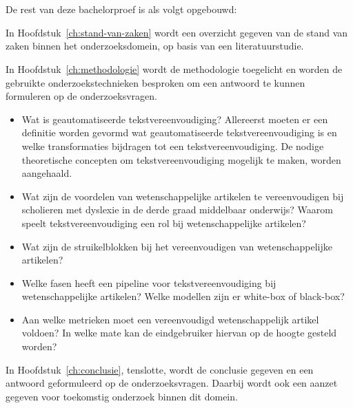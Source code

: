 \section{}%
\label{sec:opzet-bachelorproef}


De rest van deze bachelorproef is als volgt opgebouwd:

In Hoofdstuk~\ref{ch:stand-van-zaken} wordt een overzicht gegeven van de stand van zaken binnen het onderzoeksdomein, op basis van een literatuurstudie.

In Hoofdstuk~\ref{ch:methodologie} wordt de methodologie toegelicht en worden de gebruikte onderzoekstechnieken besproken om een antwoord te kunnen formuleren op de onderzoeksvragen.


\begin{itemize}
	\item Wat is geautomatiseerde tekstvereenvoudiging? Allereerst moeten er een definitie worden gevormd wat geautomatiseerde tekstvereenvoudiging is en welke transformaties bijdragen tot een tekstvereenvoudiging. De nodige theoretische concepten om tekstvereenvoudiging mogelijk te maken, worden aangehaald. 
	\item Wat zijn de voordelen van wetenschappelijke artikelen te vereenvoudigen bij scholieren met dyslexie in de derde graad middelbaar onderwijs? Waarom speelt tekstvereenvoudiging een rol bij wetenschappelijke artikelen?
	\item Wat zijn de struikelblokken bij het vereenvoudigen van wetenschappelijke artikelen?
	\item Welke fasen heeft een pipeline voor tekstvereenvoudiging bij wetenschappelijke artikelen? Welke modellen zijn er white-box of black-box?
	\item Aan welke metrieken moet een vereenvoudigd wetenschappelijk artikel voldoen? In welke mate kan de eindgebruiker hiervan op de hoogte gesteld worden? 
\end{itemize}

In Hoofdstuk~\ref{ch:conclusie}, tenslotte, wordt de conclusie gegeven en een antwoord geformuleerd op de onderzoeksvragen. Daarbij wordt ook een aanzet gegeven voor toekomstig onderzoek binnen dit domein.